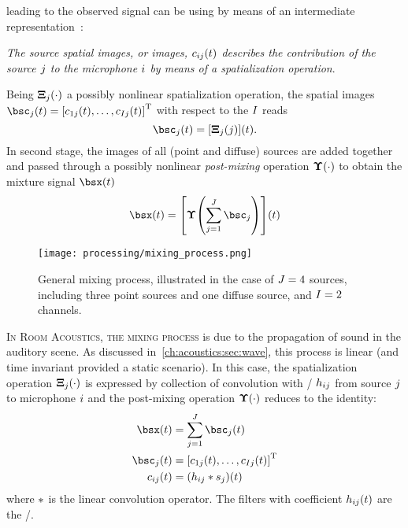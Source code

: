  leading to the observed signal can be
using by means of an intermediate representation~\cite{sturmel2012linear}:
\begin{center}
    \textit{The \emph{source spatial images}, or \emph{images},  $c_{ij}(t)$ describes the contribution
    of the source $j$ to the microphone $i$ by means of a spatialization
    operation}.
\end{center}
Being $\boldsymbol{\Xi}_{j}(\cdot)$ a possibly nonlinear spatialization operation, the spatial images
$\imgs_\idxSrc(t) = \ktranspose{\klist{\img_{1\idxSrc}(t), \dots, \img_{\numMics\idxSrc}(t)}}$ with respect to the $I$ reads
\begin{equation}
    \imgs_\idxSrc(t) = \kbracket{\spat_\idxSrc(\idxSrc)}(t)
    .
\end{equation}
In second stage, the images of all (point and diffuse) sources are added together and passed through a possibly
nonlinear \textit{post-mixing} operation $\boldsymbol{\Upsilon}(\cdot)$ to obtain the mixture signal $\mics(t)$
\begin{equation}
    \mics(t) = \kbracket{ \master\kparen{
                    \sum_{\idxSrc=1}^{\numSrcs} \imgs_\idxSrc
                    }}(t)
\end{equation}
\begin{figure}[t]
    \centering
    \texttt{[image: processing/mixing\_process.png]}
    \caption{General mixing process,
    illustrated in the case of $J = 4$ sources,
    including three point sources and one diffuse source, and $I = 2$ channels.}
    \label{fig:processing:mixing}
\end{figure}
\textsc{In Room Acoustics, the mixing process} is due to the propagation of sound in the auditory scene.
As discussed in~\cref{ch:acoustics:sec:wave}, this process is linear (and time invariant provided a static scenario).
In this case, the spatialization operation $\boldsymbol{\Xi}_{j}(\cdot)$ is expressed by
collection of convolution with \RIR/ $h_{ij}$
from source $j$ to microphone $i$ and the post-mixing operation $\boldsymbol{\Upsilon}(\cdot)$ reduces to the identity:
\begin{align}
    \mics(t)         &= \sum_{\idxSrc=1}^{\numSrcs} \imgs_\idxSrc(t)\\
    \imgs_\idxSrc(t) &= \ktranspose{\klist{\img_{1\idxSrc}(t), \dots, \img_{\numMics\idxSrc}(t)}}\\
    \img_{\idxMic\idxSrc}(t) &=  \kparen{h_{\idxMic\idxSrc} \conv \src_\idxSrc} (t)
\end{align}
where $\ast$ is the linear convolution operator. The filters with coefficient $h_{ij}(t)$ are the \RIR/.

